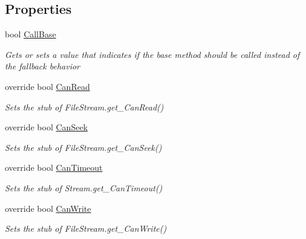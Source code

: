 \subsection*{Properties}
\begin{DoxyCompactItemize}
\item 
bool \hyperlink{class_system_1_1_i_o_1_1_fakes_1_1_stub_file_stream_a9632382329d8c1d2e71baaeb74d58842}{Call\-Base}
\begin{DoxyCompactList}\small\item\em Gets or sets a value that indicates if the base method should be called instead of the fallback behavior\end{DoxyCompactList}\item 
override bool \hyperlink{class_system_1_1_i_o_1_1_fakes_1_1_stub_file_stream_a83f88fad7d526fa0ec57cf592095344e}{Can\-Read}
\begin{DoxyCompactList}\small\item\em Sets the stub of File\-Stream.\-get\-\_\-\-Can\-Read()\end{DoxyCompactList}\item 
override bool \hyperlink{class_system_1_1_i_o_1_1_fakes_1_1_stub_file_stream_a443966b8b7fbeeb75c9545e5962aaf7a}{Can\-Seek}
\begin{DoxyCompactList}\small\item\em Sets the stub of File\-Stream.\-get\-\_\-\-Can\-Seek()\end{DoxyCompactList}\item 
override bool \hyperlink{class_system_1_1_i_o_1_1_fakes_1_1_stub_file_stream_a8189a942ec0ea196bc25a77867b7f6bb}{Can\-Timeout}
\begin{DoxyCompactList}\small\item\em Sets the stub of Stream.\-get\-\_\-\-Can\-Timeout()\end{DoxyCompactList}\item 
override bool \hyperlink{class_system_1_1_i_o_1_1_fakes_1_1_stub_file_stream_aadf1d6c36f799460a30d53e8e7540f66}{Can\-Write}
\begin{DoxyCompactList}\small\item\em Sets the stub of File\-Stream.\-get\-\_\-\-Can\-Write()\end{DoxyCompactList}\item 

\end{DoxyCompactItemize}

